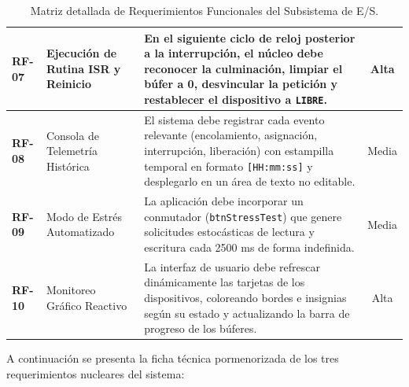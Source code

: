 \documentclass[11pt,letterpaper]{article}
\begin{document}
\begin{table}[htbp]
\begin{tabularx}{\textwidth}{|l|p{4.5cm}|L|c|}
\textbf{RF-07} & Ejecución de Rutina ISR y Reinicio & En el siguiente ciclo de reloj posterior a la interrupción, el núcleo debe reconocer la culminación, limpiar el búfer a 0, desvincular la petición y restablecer el dispositivo a \texttt{LIBRE}. & Alta \\ \hline
\textbf{RF-08} & Consola de Telemetría Histórica & El sistema debe registrar cada evento relevante (encolamiento, asignación, interrupción, liberación) con estampilla temporal en formato \texttt{[HH:mm:ss]} y desplegarlo en un área de texto no editable. & Media \\ \hline
\textbf{RF-09} & Modo de Estrés Automatizado & La aplicación debe incorporar un conmutador (\texttt{btnStressTest}) que genere solicitudes estocásticas de lectura y escritura cada 2500 ms de forma indefinida. & Media \\ \hline
\textbf{RF-10} & Monitoreo Gráfico Reactivo & La interfaz de usuario debe refrescar dinámicamente las tarjetas de los dispositivos, coloreando bordes e insignias según su estado y actualizando la barra de progreso de los búferes. & Alta \\ \hline
\end{tabularx}
\caption{Matriz detallada de Requerimientos Funcionales del Subsistema de E/S.}
\label{tab:rf}
\end{table}

A continuación se presenta la ficha técnica pormenorizada de los tres requerimientos nucleares del sistema:
\end{document}
